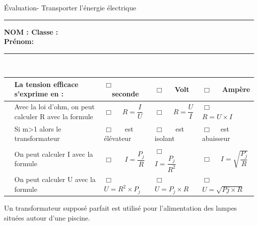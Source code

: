 \documentclass[11pt,a4paper]{article}
\begin{document}
\noindent

\begin{center}
\LARGE{Évaluation- Transporter l'énergie électrique}\\[8mm]
\end{center}
\normalsize
\hrule 


\flushleft \textbf{NOM : \hfill Classe : \hspace{3cm} ~~\\[2mm]
Prénom:\\[0,4cm]
}
\hrule\
\\[0,2cm]

\vspace {8 mm}




    \begin{tabular}{p{2mm} p{5.5cm}|C{3cm}|C{3cm}|C{3cm}}
    

         & La tension efficace s'exprime en :& $\Box $ ~~seconde & $\Box $ ~~Volt  & $\Box $ ~~Ampère \\
         \hline
       & Avec la loi d'ohm, on peut calculer R avec la formule  & $\Box $ ~~$R=\dfrac{I}{U}$ & $\Box $ ~~$R=\dfrac{U}{I}$   & $\Box $ ~~ $R = U \times I$ \\
        \hline
          & Si m>1 alors le transformateur  &$\Box $ ~~ est élévateur  &$\Box $ ~~ est isolant  & $\Box $ ~~est abaisseur  \\
         \hline
          &On peut calculer I avec la formule  &$\Box $ ~~ $I=\dfrac{P_j}{R}$  &$\Box $ ~~ $I=\dfrac{P_j}{R^2}$  & $\Box $ ~~$I=\sqrt{\dfrac{P_j}{R}}$  \\

         \hline
         
         & On peut calculer U avec la formule &$\Box $ ~~ $U=R^2 \times P_j$  &$\Box $ ~~ $U= P_j \times R$  & $\Box $ ~~ $U=\sqrt{Pj \times R}$  \\

 
        
         \end{tabular}
\vspace{3mm}


Un transformateur supposé parfait est utilisé pour l'alimentation des lampes situées autour d'une piscine. 
\end{document}
